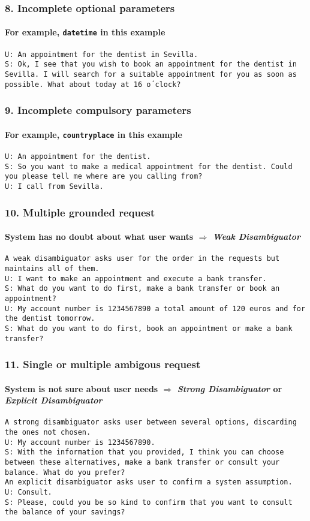 \documentclass[11pt]{beamer}
\newcommand{\system}[1]{{\color{red}\texttt{S: #1}}\\}
\newcommand{\user}[1]{{\color{teal}\texttt{U: #1}}\\}
\newcommand{\comment}[1]{{\color{orange}\texttt{#1}}\\}
\begin{document}
\begin{frame}
\frametitle{8. Incomplete optional parameters}
\framesubtitle{For example, \texttt{datetime} in this example}
\user{An appointment for the dentist in Sevilla.}
\system{Ok, I see that you wish to book an appointment for the dentist in Sevilla. I will search for a suitable appointment for you as soon as possible. What about today at 16 o´clock?}
\end{frame}

\begin{frame}
\frametitle{9. Incomplete compulsory parameters}
\framesubtitle{For example, \texttt{countryplace} in this example}
\user{An appointment for the dentist.}
\system{So you want to make a medical appointment for the dentist. Could you please tell me where are you calling from?}
\user{I call from Sevilla.}
\end{frame}

\begin{frame}
\frametitle{10. Multiple grounded request}
\framesubtitle{System has no doubt about what user wants $\Rightarrow$ \emph{Weak Disambiguator}}
\comment{A weak disambiguator asks user for the order in the requests but maintains all of them.}
\vspace{10pt}
\user{I want to make an appointment and execute a bank transfer.}
\system{What do you want to do first, make a bank transfer or book an appointment?}
\vspace{10pt}
\user{My account number is 1234567890 a total amount of 120 euros and for the dentist tomorrow.}
\system{What do you want to do first, book an appointment or make a bank transfer?}
\end{frame}

\begin{frame}
\frametitle{11. Single or multiple ambigous request}
\framesubtitle{System is not sure about user needs $\Rightarrow$ \emph{Strong Disambiguator} or \emph{Explicit Disambiguator}}
\comment{A strong disambiguator asks user between several options, discarding the ones not chosen.}
\vspace{10pt}
\user{My account number is 1234567890.}
\system{With the information that you provided, I think you can choose between these alternatives, make a bank transfer or consult your balance. What do you prefer?}
\vspace{10pt}
\comment{An explicit disambiguator asks user to confirm a system assumption.}
\vspace{10pt}
\user{Consult.}
\system{Please, could you be so kind to confirm that you want to consult the balance of your savings?}
\end{frame}
\end{document}

